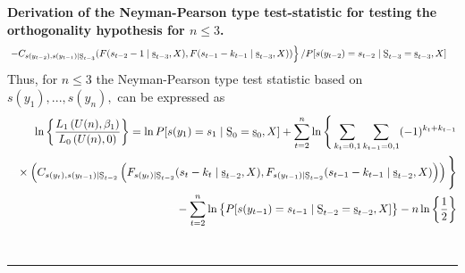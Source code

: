 \documentclass[harvard,11pt]{article}
\newenvironment{proof}[1][Proof]{\textbf{#1.} }{\  \rule{0.5em}{0.5em}}
\begin{document}
\begin{proof}[Derivation of the Neyman-Pearson type test-statistic for testing the orthogonality hypothesis for $n\leq 3$]
\begin{align*}
&\left.-C_{s(y_{t-2}),s(y_{t-1})\mid\text{\b{S}}%
_{t-3}}(F(s_{t-2}-1\mid\text{\b{s}}%
_{t-3},X),F(s_{t-1}-k_{t-1}\mid\text{\b{s}}%
_{t-3},X))\right\}/P[s(y_{t-2})=s_{t-2}\mid\text{\b{S}}%
_{t-3}=\text{\b{s}}%
_{t-3},X]
\end{align*}
\endgroup
Thus, for $n\leq 3$ the Neyman-Pearson type test statistic based on $%
s(y_{1}),...,s(y_{n}),$ can be expressed as%
\begingroup
\allowdisplaybreaks
\begin{align*}
\ln \left\{ \frac{L_1\left( U(n),\beta _{1}\right) }{L
_{0}\left( U(n),0\right) }\right\} =\ln P[s(y_{1})=s_{1}\mid \text{\b{S}}_{0}=\text{\b{s}}_{0},X]+\sum\limits_{t=2}^{n}\ln\Bigg\{\sum\limits_{k_t=0,1}\sum\limits_{k_{t-1}=0,1}(-1)^{k_t+k_{t-1}} \\
\textcolor{white}{=}\times \left(C_{s(y_t),s(y_{t-1})\mid \text{\b{S}}%
_{t-2}}\left(F_{s(y_t)\mid \text{\b{S}}%
_{t-2} }(s_t-k_t\mid \text{\b{s}}%
_{t-2},X),F_{s(y_{t-1})\mid \text{\b{S}}%
_{t-2}}(s_{t-1}-k_{t-1}\mid \text{\b{s}}%
_{t-2},X)\right)\right)\Bigg\}\\
\textcolor{white}{=}-\sum\limits_{t=2}^{n}\ln\left\{P[s(y_{t-1})=s_{t-1}\mid \text{\b{S}}_{t-2}=\text{\b{s}}_{t-2},X]\right\}-n\ln \left\{ \frac{1}{2}\right\}
\end{align*}%
\endgroup
\end{proof}
\end{document}
